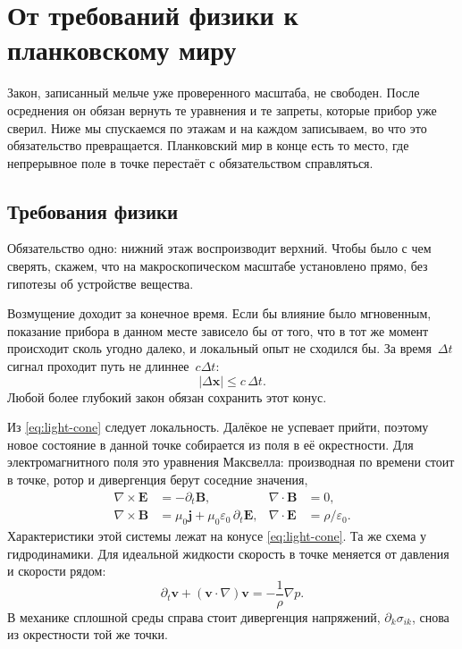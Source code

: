 \chapter{От требований физики к планковскому миру}
\label{ch:descent}

Закон, записанный мельче уже проверенного масштаба, не свободен.
После осреднения он обязан вернуть те уравнения и те запреты, которые прибор уже сверил.
Ниже мы спускаемся по этажам и на каждом записываем, во что это обязательство превращается.
Планковский мир в конце есть то место, где непрерывное поле в точке перестаёт с обязательством справляться.

\section{Требования физики}
\label{sec:requirements}

Обязательство одно: нижний этаж воспроизводит верхний.
Чтобы было с чем сверять, скажем, что на макроскопическом масштабе установлено прямо, без гипотезы об устройстве вещества.

Возмущение доходит за конечное время.
Если бы влияние было мгновенным, показание прибора в данном месте зависело бы от того,
что в тот же момент происходит сколь угодно далеко, и локальный опыт не сходился бы.
За время~$\Delta t$ сигнал проходит путь не длиннее~$c\Delta t$:
\begin{equation}
  |\Delta\mathbf{x}| \le c\,\Delta t.
  \label{eq:light-cone}
\end{equation}
Любой более глубокий закон обязан сохранить этот конус.

Из \eqref{eq:light-cone} следует локальность.
Далёкое не успевает прийти, поэтому новое состояние в данной точке собирается из поля в её окрестности.
Для электромагнитного поля это уравнения Максвелла:
производная по времени стоит в точке, ротор и дивергенция берут соседние значения,
\begin{align}
  \nabla\times\mathbf{E} &= -\partial_t\mathbf{B}, &
  \nabla\cdot\mathbf{B} &= 0, \label{eq:maxwell-hom}\\
  \nabla\times\mathbf{B}
    &= \mu_0\mathbf{j} + \mu_0\varepsilon_0\,\partial_t\mathbf{E}, &
  \nabla\cdot\mathbf{E} &= \rho/\varepsilon_0. \label{eq:maxwell-inh}
\end{align}
Характеристики этой системы лежат на конусе \eqref{eq:light-cone}.
Та же схема у гидродинамики.
Для идеальной жидкости скорость в точке меняется от давления и скорости рядом:
\begin{equation}
  \partial_t\mathbf{v} + (\mathbf{v}\cdot\nabla)\mathbf{v}
  = -\frac{1}{\rho}\nabla p.
  \label{eq:euler}
\end{equation}
В механике сплошной среды справа стоит дивергенция напряжений,
$\partial_k\sigma_{ik}$, снова из окрестности той же точки.


